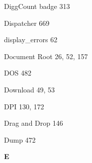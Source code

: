 \documentclass{book}
\renewcommand\indexspace{\vspace{11pt}}
\begin{document}
\begin{multicols}{2}
\begin{osp-index}
  \item DiggCount badge\hspace{1mm} 313
  \item Dispatcher\hspace{1mm} 669
  \item display\_errors\hspace{1mm} 62
  \item Document Root\hspace{1mm} 26, 52, 157
  \item DOS\hspace{1mm} 482
  \item Download\hspace{1mm} 49, 53
  \item DPI\hspace{1mm} 130, 172
  \item Drag and Drop\hspace{1mm} 146
  \item Dump\hspace{1mm} 472

  \indexspace
{\sffamily\bfseries E}\nopagebreak


\end{osp-index}
\end{multicols}
\end{document}
